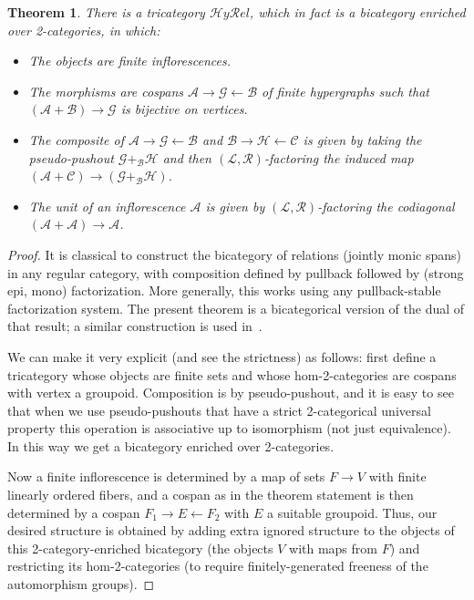 \documentclass{article}
\newtheorem{thm}{Theorem}[section]
\theoremstyle{definition}
\theoremstyle{remark}
\def\A{\mathcal{A}}
\def\B{\mathcal{B}}
\def\C{\mathcal{C}}
\def\G{\mathcal{G}}
\def\H{\mathcal{H}}
\def\L{\mathcal{L}}
\def\R{\mathcal{R}}
\let\ot\leftarrow
\def\hyrel{\mathcal{H}\mathit{y}\mathcal{R}\mathit{el}}
\begin{document}
\begin{thm}
  There is a tricategory $\hyrel$, which in fact is a bicategory enriched over 2-categories, in which:
  \begin{itemize}
  \item The objects are finite inflorescences.
  \item The morphisms are cospans $\A \to \G \ot \B$ of finite hypergraphs such that $(\A+\B) \to \G$ is bijective on vertices.
  \item The composite of $\A \to \G \ot \B$ and $\B \to \H \ot \C$ is given by taking the pseudo-pushout $\G +_{\B} \H$ and then $(\L,\R)$-factoring the induced map $(\A + \C) \to (\G +_{\B} \H)$.
  \item The unit of an inflorescence $\A$ is given by $(\L,\R)$-factoring the codiagonal $(\A+\A)\to\A$.
  \end{itemize}
\end{thm}
\begin{proof}
  It is classical to construct the bicategory of relations (jointly monic spans) in any regular category, with composition defined by pullback followed by (strong epi, mono) factorization.
  More generally, this works using any pullback-stable factorization system.
  The present theorem is a bicategorical version of the dual of that result; a similar construction is used in~\cite{cjsv:modulated-bicats}.

  We can make it very explicit (and see the strictness) as follows: first define a tricategory whose objects are finite sets and whose hom-2-categories are cospans with vertex a groupoid.
  Composition is by pseudo-pushout, and it is easy to see that when we use pseudo-pushouts that have a strict 2-categorical universal property this operation is associative up to isomorphism (not just equivalence).
  In this way we get a bicategory enriched over 2-categories.

  Now a finite inflorescence is determined by a map of sets $F\to V$ with finite linearly ordered fibers, and a cospan as in the theorem statement is then determined by a cospan $F_1 \to E \ot F_2$ with $E$ a suitable groupoid.
  Thus, our desired structure is obtained by adding extra ignored structure to the objects of this 2-category-enriched bicategory (the objects $V$ with maps from $F$) and restricting its hom-2-categories (to require finitely-generated freeness of the automorphism groups).
\end{proof}
\end{document}
